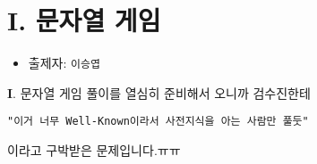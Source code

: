 \section{I. 문자열 게임}

\begin{frame} %
    \begin{itemize}
        \item 출제자: \texttt{이승엽}
    \end{itemize}
\end{frame}

\begin{frame}{\textbf{I}. 문자열 게임}
    풀이를 열심히 준비해서 오니까 검수진한테
    
    \vspace{18pt}
    
    \texttt{"이거 너무 Well-Known이라서 사전지식을 아는 사람만 풀둣"}
    
    \vspace{18pt}
    
    이라고 구박받은 문제입니다.ㅠㅠ
\end{frame}
